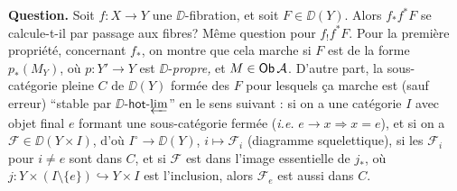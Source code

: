 \textbf{Question.} Soit $f : X \to Y$ une $\DD$-fibration, et soit $F \in \DD(Y)$. Alors $f_*f^*F$ se calcule-t-il par passage aux fibres? Même question pour $f_!f^*F$. Pour la première propriété, concernant $f_*$, on montre que cela marche si $F$ est de la forme $p_*(M_Y)$, où $p : Y' \to Y$ est $\DD$-\textit{propre,} et $M \in \mathsf{Ob}\, \mathcal{A}$. D'autre part, la sous-catégorie pleine $C$ de $\DD(Y)$ formée des $F$ pour lesquels ça marche est (sauf erreur) “stable par $\DD$-$\mathsf{hot}$-$\varprojlim$” en le sens suivant : si on a une catégorie $I$ avec objet final $e$ formant une sous-catégorie fermée (\textit{i.e.} $e \to x \Rightarrow x = e$), et si on a $\mathcal{F} \in \DD(Y \times I)$, d'où $I^\circ \to \DD(Y)$, $i \mapsto \mathcal{F}_i$ (diagramme squelettique), si les $\mathcal{F}_i$ pour $i \neq e$ sont dans $C$, et si $\mathcal{F}$ est dans l'image essentielle de $j_*$, où $j : Y \times (I \setminus \{e\}) \hookrightarrow Y \times I$ est l'inclusion, alors $\mathcal{F}_e$ est aussi dans $C$.

